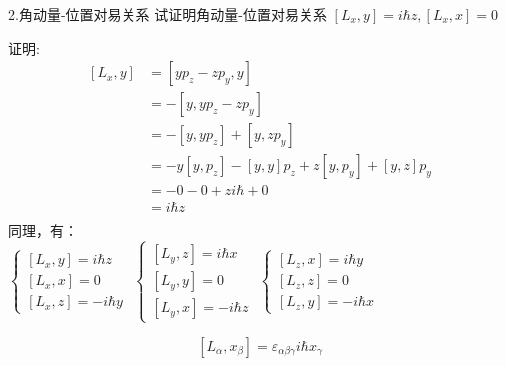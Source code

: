 \begin{frame} [allowframebreaks=]
    \frametitle{}
    \begin{tcolorbox1}{2.角动量-位置对易关系}
        试证明角动量-位置对易关系 $[L_x,y]=i\hbar z,  [L_x,x]=0$
    \end{tcolorbox1}
    \alert{证明:} 
    \begin{equation*}
        \begin{split}
        [L_x,y]&= [yp_z-zp_y,y]\\
        &=-[y,yp_z-zp_y]\\
        &= -[y,yp_z] + [y,zp_y]\\
        &=-y[y,p_z] -[y,y]p_z + z[y,p_y] + [y,z]p_y\\
        &=-0 -0 + z i\hbar + 0\\
        &=i\hbar z \\
        \end{split}  
    \end{equation*}
    同理，有：\\
    $\begin{cases}
        [L_x,y]= i\hbar z  \\ 
        [L_x,x]= 0  \\ 
        [L_x,z]= -i\hbar y 
    \end{cases}$
    $\begin{cases}
        [L_y,z]= i\hbar x  \\ 
        [L_y,y]= 0  \\ 
        [L_y,x]= -i\hbar z 
    \end{cases}$
    $\begin{cases}
        [L_z,x]= i\hbar y  \\ 
        [L_z,z]= 0  \\ 
        [L_z,y]= -i\hbar x 
    \end{cases}$
    \begin{tcolorbox}[colback=yellow!5,colframe=red!75!black,title=角动量-位置对易关系]
        $$ [L_\alpha,x_\beta]= \varepsilon_{\alpha\beta\gamma} i\hbar x_\gamma $$ 
    \end{tcolorbox}
\end{frame} 


